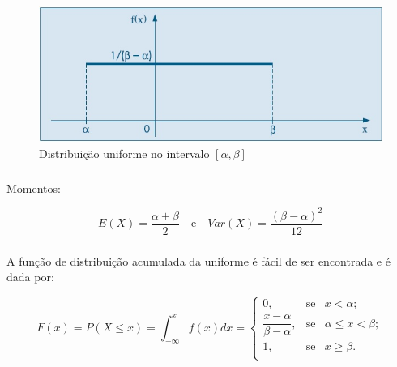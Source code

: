 \documentclass[14pt,aspectratio=1610]{beamer}
\begin{document}
\begin{frame}{}
\frametitle{}
\begin{block}{}
\justifying
\begin{figure}[H]
    \centering
    \includegraphics[scale=0.5]{Figuras/uniform}
    \caption{Distribuição uniforme no intervalo $[\alpha,\beta]$}
  \end{figure}
\end{block}
\end{frame}

\begin{frame}{}
\frametitle{}
\begin{block}{Momentos:}
\justifying

$$E(X)=\dfrac{\alpha+\beta}{2}\quad \textrm{e}\quad Var(X)=\dfrac{(\beta-\alpha)^{2}}{12}$$

\end{block}
\end{frame}

\begin{frame}{}
\frametitle{}
\begin{block}{}
\justifying
A função de distribuição acumulada da uniforme é fácil de ser encontrada e é dada por:

$$
F(x)=P(X\leq x)={\displaystyle \int_{-\infty}^{x}f(x)dx}=\left\{
\begin{array}{ccccc}
0,           & \textrm{se} & x<\alpha     ;\\
\dfrac{x-\alpha}{\beta-\alpha},& \textrm{se} & \alpha\leq x< \beta;\\
1,           & \textrm{se} & x\geq \beta .\\
\end{array}
\right.
$$
\end{block}
\end{frame}
\end{document}
